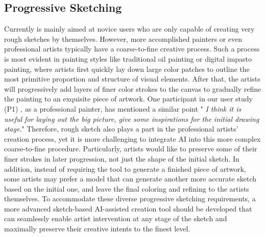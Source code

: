 \subsection{Progressive Sketching}
Currently \tool is mainly aimed at novice users who are only capable of creating very rough sketches by themselves.
However, more accomplished painters or even professional artists typically have a coarse-to-fine creative process. 
Such a process is most evident in painting styles like traditional oil painting or digital impasto painting, where artists first quickly lay down large color patches to outline the most primitive proportion and structure of visual elements.
After that, the artists will progressively add layers of finer color strokes to the canvas to gradually refine the painting to an exquisite piece of artwork.
One participant in our user study (P1) , as a professional painter, has mentioned a similar point "\emph{
I think it is useful for laying out the big picture, give some inspirations for the initial drawing stage}."
Therefore, rough sketch also plays a part in the professional artists' creation process, yet it is more challenging to integrate AI into this more complex coarse-to-fine procedure.
Particularly, artists would like to preserve some of their finer strokes in later progression, not just the shape of the initial sketch.
In addition, instead of requiring the tool to generate a finished piece of artwork, some artists may prefer a model that can generate another more accurate sketch based on the initial one, and leave the final coloring and refining to the artists themselves.
To accommodate these diverse progressive sketching requirements, a more advanced sketch-based AI-assisted creation tool should be developed that can seamlessly enable artist intervention at any stage of the sketch and maximally preserve their creative intents to the finest level. 

